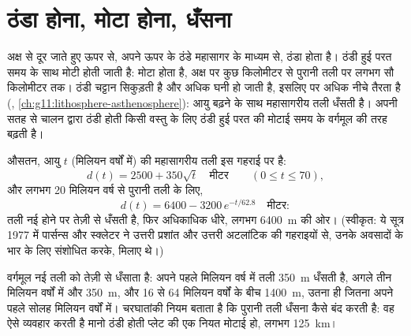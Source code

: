 \section{ठंडा होना, मोटा होना, धँसना}

अक्ष से दूर जाते हुए  ऊपर से, अपने ऊपर के ठंडे महासागर के माध्यम से,
ठंडा होता है। ठंडी हुई परत समय के साथ मोटी होती जाती है:
 मोटा होता है, अक्ष पर कुछ किलोमीटर से पुरानी तली पर लगभग सौ
किलोमीटर तक। ठंडी चट्टान सिकुड़ती है और अधिक घनी हो जाती है, इसलिए
  पर अधिक नीचे तैरता है (,
\cref{ch:g11:lithosphere-asthenosphere}): आयु बढ़ने के साथ महासागरीय तली धँसती है।
अपनी सतह से चालन द्वारा ठंडी होती किसी वस्तु के लिए
ठंडी हुई परत की मोटाई समय के वर्गमूल की तरह बढ़ती है।

\begin{proposition}\label{prop:g11:ocean-ridges:depth-age}
औसतन, आयु $t$ (मिलियन वर्षों में) की महासागरीय तली इस गहराई पर है:
\[
  d(t) = 2500 + 350\sqrt{t} \quad \text{मीटर} \qquad (0 \le t \le 70),
\]
और लगभग 20 मिलियन वर्ष से पुरानी तली के लिए,
\[
  d(t) = 6400 - 3200\,e^{-t/62.8} \quad \text{मीटर}:
\]
तली नई होने पर तेज़ी से धँसती है, फिर अधिकाधिक धीरे, लगभग
\qty{6400}{m} की ओर। (स्वीकृत: ये सूत्र 1977 में पार्सन्स और स्क्लेटर ने
उत्तरी प्रशांत और उत्तरी अटलांटिक की गहराइयों से, उनके
अवसादों के भार के लिए संशोधित करके, मिलाए थे।)
\end{proposition}

वर्गमूल नई तली को तेज़ी से धँसाता है: अपने पहले मिलियन वर्ष में
तली \qty{350}{m} धँसती है, अगले तीन मिलियन वर्षों में और
\qty{350}{m}, और 16 से 64 मिलियन वर्षों के बीच \qty{1400}{m}, उतना ही जितना
अपने पहले सोलह मिलियन वर्षों में। चरघातांकी नियम बताता है कि पुरानी
तली धँसना कैसे बंद करती है: वह ऐसे व्यवहार करती है मानो ठंडी होती प्लेट की एक नियत मोटाई हो,
लगभग \qty{125}{km}।

